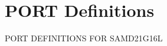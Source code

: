 \hypertarget{group___s_a_m_d21_g16_l__port}{}\section{P\+O\+RT Definitions}
\label{group___s_a_m_d21_g16_l__port}
P\+O\+RT D\+E\+F\+I\+N\+I\+T\+I\+O\+NS F\+OR S\+A\+M\+D21\+G16L 